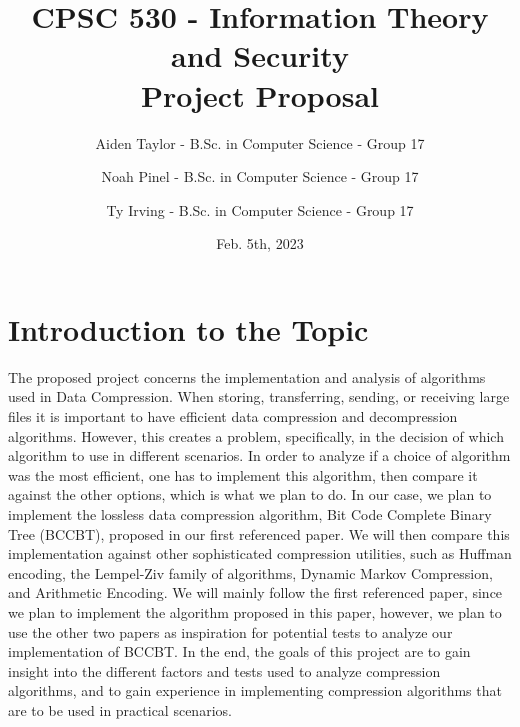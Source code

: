 \documentclass[11pt]{article}
\title{CPSC 530 - Information Theory and Security \\ Project Proposal}
\author{
Aiden Taylor - B.Sc. in Computer Science - Group 17
\and
Noah Pinel - B.Sc. in Computer Science - Group 17
\and
Ty Irving - B.Sc. in Computer Science - Group 17
}
\date{Feb. 5th, 2023}
\begin{document}
\maketitle
\newpage

\section*{Introduction to the Topic}
The proposed project concerns the implementation and analysis of algorithms used in Data Compression.
When storing, transferring, sending, or receiving large files it is important to have efficient data compression and decompression algorithms.
However, this creates a problem, specifically, in the decision of which algorithm to use in different scenarios.
In order to analyze if a choice of algorithm was the most efficient, one has to implement this algorithm, then compare it against the other options,
which is what we plan to do.
In our case, we plan to implement
the lossless data compression algorithm, Bit Code Complete Binary Tree (BCCBT), proposed in our first referenced paper. 
We will then compare this implementation against other sophisticated compression utilities,
such as Huffman encoding, the Lempel-Ziv family of algorithms, Dynamic Markov Compression, and Arithmetic Encoding.
We will mainly follow the first referenced paper, since we plan to implement the algorithm proposed in this paper,
however, we plan to use the other two papers as inspiration for potential tests to analyze our implementation of BCCBT.
In the end, the goals of this project are to gain insight into the different factors and tests used to analyze compression algorithms,
and to gain experience in implementing compression algorithms that are to be used in practical scenarios.
\end{document}
